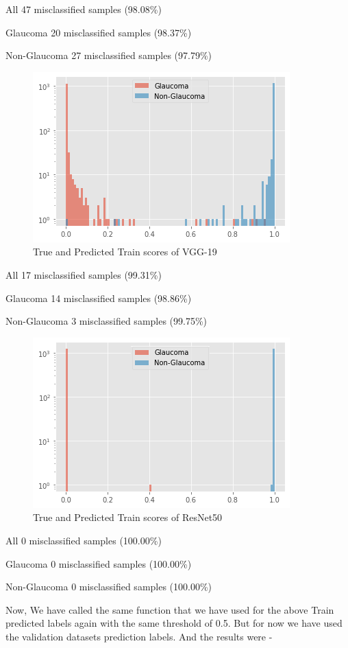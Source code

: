 \documentclass[conference]{IEEEtran}
\begin{document}
\begin{center}
\newpage
All   47 misclassified samples (98.08\%)

Glaucoma  20 misclassified samples (98.37\%)

Non-Glaucoma  27 misclassified samples (97.79\%)
\end{center}
\vspace{5mm}
\begin{figure}[hbt!]
\centering
\includegraphics[scale=0.5]{fig-39.png}
\caption{True and Predicted Train scores of VGG-19}
\label{fig:x True and Predicted Train scores of VGG-19}
\end{figure}
\begin{center}
All   17 misclassified samples (99.31\%)

Glaucoma  14 misclassified samples (98.86\%)

Non-Glaucoma   3 misclassified samples (99.75\%)
\end{center}
\vspace{5mm}
\begin{figure}[hbt!]
\centering
\includegraphics[scale=0.5]{fig-40.png}
\caption{True and Predicted Train scores of ResNet50}
\label{fig:x True and Predicted Train scores of ResNet50}
\end{figure}
\begin{center}
All    0 misclassified samples (100.00\%)

Glaucoma   0 misclassified samples (100.00\%)

Non-Glaucoma   0 misclassified samples (100.00\%)
\end{center}
\vspace{5mm}
Now, We have called the same function that we have used for the above Train predicted labels again with the same threshold of 0.5. But for now we have used the validation datasets prediction labels. And the results were - 
\end{document}
